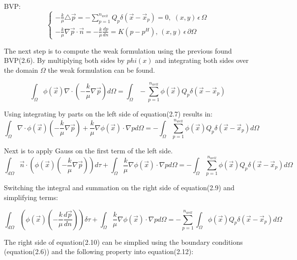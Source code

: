 \documentclass[a4paper]{report}
\begin{document}
BVP:
\begin{equation}
	\begin{cases}
		-\frac{k}{\mu}\triangle\vec{p}=-\sum_{p=1}^{n_{well}}Q_p\delta(\vec{x}-\vec{x}_p)=0,\, \, (x,y) \, \epsilon \, \Omega\\
		-\frac{k}{\mu}\nabla\vec{p}\cdot\vec{n}=-\frac{k}{\mu}\frac{dp}{dn} =K(p-p^H), \, (x,y)\,  \epsilon  \, \partial\Omega
	\end{cases}
\end{equation}

\bigskip

The next step is to compute the weak formulation using the previous found BVP(2.6). By multiplying both sides by $phi(x)$ and integrating both sides over the domain $\Omega$ the weak formulation can be found.

\begin{equation}
	\int_{\Omega}\phi(\vec{x})\nabla\cdot( -\frac{k}{\mu}\nabla\vec{p}) d\Omega =\int_{\Omega}-\sum_{p=1}^{n_{well}}\phi(\vec{x})  Q_p\delta(\vec{x}-\vec{x}_p)
\end{equation}

Using integrating by parts on the left side of equation(2.7) results in:
\begin{equation}
	\int_{\Omega}\nabla\cdot\phi(\vec{x})(-\frac{k}{\mu}\nabla\vec{p})+\frac{k}{\mu}\nabla\phi(\vec{x})\cdot\nabla p d\Omega= -\int_{\Omega}\sum_{p=1}^{n_{well}}\phi(\vec{x}) Q_p\delta(\vec{x}-\vec{x}_p)d\Omega
\end{equation}

Next is to apply Gauss on the first term of the left side.
\begin{equation}
	\int_{d\Omega}\vec{n}\cdot(\phi(\vec{x})(-\frac{k}{\mu}\nabla\vec{p}))d\tau+\int_{\Omega}\frac{k}{\mu}\nabla\phi(\vec{x})\cdot\nabla p d\Omega= -\int_{\Omega}\sum_{p=1}^{n_{well}}\phi(\vec{x}) Q_p\delta(\vec{x}-\vec{x}_p)d\Omega
\end{equation}


Switching the integral and summation on the right side of equation(2.9) and simplifying terms:

\begin{equation}
	\int_{d\Omega}(\phi(\vec{x})(-\frac{k}{\mu}\frac{d\vec{p}}{dn}))\delta\tau+\int_{\Omega}\frac{k}{\mu}\nabla\phi(\vec{x})\cdot\nabla p d\Omega= -\sum_{p=1}^{n_{well}}\int_{\Omega}\phi(\vec{x}) Q_p\delta(\vec{x}-\vec{x}_p)d\Omega
\end{equation}


The right side of equation(2.10) can be simplied using the boundary conditions (equation(2.6)) and the following property into equation(2.12): 
\end{document}
